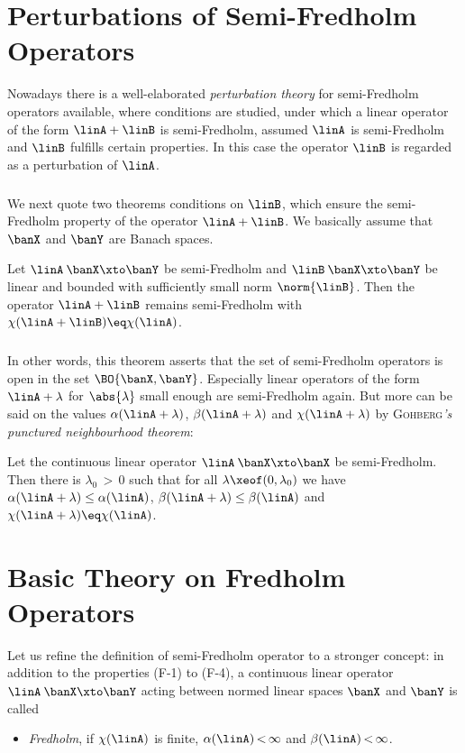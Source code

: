\documentclass[11pt,twoside]{article}
\begin{document}
\section{Perturbations of Semi-Fredholm Operators}
Nowadays there is a well-elaborated \textit{perturbation theory}
for semi-Fredholm operators available,
where conditions are studied,
under which a linear operator of the form $\linA + \linB$ is semi-Fredholm,
assumed $\linA$ is semi-Fredholm and $\linB$ fulfills certain properties.
In this case the operator $\linB$ is regarded as a perturbation of $\linA$.

\subparagraph{} %
We next quote two theorems {\wrt} conditions on $\linB$,
which ensure the semi-Fredholm property of the operator $\linA + \linB$.
We basically assume that $\banX$ and $\banY$ are Banach spaces.

\begin{theorem1}\label{YOOD_THEOREM}
Let $\linA \: \banX \xto \banY$ be semi-Fredholm
and $\linB \: \banX \xto \banY$ be linear and bounded
with sufficiently small norm $\norm{\linB}$.
Then the operator $\linA + \linB$ remains semi-Fredholm
with $\chi(\linA+\linB) \eq \chi(\linA)$.
\end{theorem1}

\subparagraph{} %
In other words,
this theorem asserts
that the set of semi-Fredholm operators is open in the set $\BO{\banX,\banY}$.
Especially linear operators of the form $\linA + \lambda$ for $\abs{\lambda} $ 
small enough are semi-Fredholm again.
But more can be said on the values $\alpha(\linA+\lambda)$,
$\beta(\linA+\lambda)$ and $\chi(\linA+\lambda)$
by \textsc{Gohberg}\textit{'s punctured neighbourhood theorem}:

\begin{theorem1}\label{PUNCTURED_NEIGHBOURHOOD_THEOREM}
Let the continuous linear operator $\linA \: \banX \xto \banX$ be semi-Fredholm.
Then there is $\lambda_0 {\,>\,} 0$
such that for all $\lambda \xeof (0,\lambda_0)$ we have
$\alpha(\linA + \lambda) \leq \alpha(\linA)$,
$\beta (\linA + \lambda) \leq \beta (\linA)$
and
$\chi  (\linA + \lambda) \eq  \chi  (\linA)$.
\end{theorem1}

\section{Basic Theory on Fredholm Operators}
Let us refine the definition of semi-Fredholm operator
to a stronger concept:
in addition to the properties (F-1) to (F-4),
a continuous linear operator $\linA \: \banX \xto \banY$
acting between normed linear spaces $\banX$ and $\banY$ is called
\begin{itemize}[leftmargin=12mm]
\item[(F-5)]
\textit{Fredholm},
if $\chi(\linA)$ is finite,
{\ie} $\alpha(\linA) {\,<\,} \infty$ and $\beta(\linA) {\,<\,} \infty$.
\end{itemize}
\end{document}
